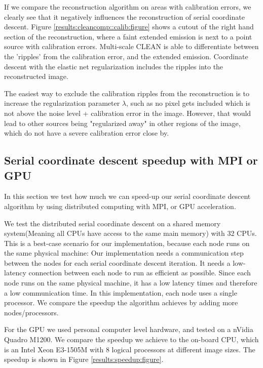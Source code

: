 If we compare the reconstruction algorithm on areas with calibration errors, we clearly see that it negatively influences the reconstruction of serial coordinate descent. Figure \ref{results:cleancomp::calib:figure} shows a cutout of the right hand section of the reconstruction, where a faint extended emission is next to a point source with calibration errors. Multi-scale CLEAN is able to differentiate between the 'ripples' from the calibration error, and the extended emission. Coordinate descent with the elastic net regularization includes the ripples into the reconstructed image. 

The easiest way to exclude the calibration ripples from the reconstruction is to increase the regularization parameter $\lambda$, such as no pixel gets included which is not above the noise level + calibration error in the image. However, that would lead to other sources being "regularized away" in other regions of the image, which do not have a severe calibration error close by. 


\subsection{Serial coordinate descent speedup with MPI or GPU}\label{results:speedup}
In this section we test how much we can speed-up our serial coordinate descent algorithm by using distributed computing with MPI, or GPU acceleration.

We test the distributed serial coordinate descent on a shared memory system(Meaning all CPUs have access to the same main memory) with 32 CPUs. This is a best-case scenario for our implementation, because each node runs on the same physical machine: Our implementation needs a communication step between the nodes for each serial coordinate descent iteration. It needs a low-latency connection between each node to run as efficient as possible. Since each node runs on the same physical machine, it has a low latency times and therefore a low communication time. In this implementation, each node uses a single processor. We compare the speedup the algorithm achieves by adding more nodes/processors.

For the GPU we used personal computer level hardware, and tested on a nVidia Quadro M1200. We compare the speedup we achieve to the on-board CPU, which is an Intel Xeon E3-1505M with 8 logical processors at different image sizes. The speedup is shown in Figure \ref{results:speedup:figure}.

